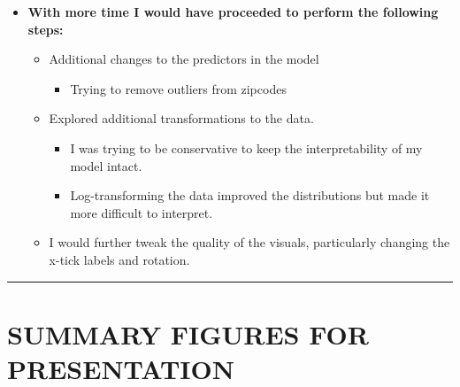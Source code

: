 \documentclass[11pt]{article}
\providecommand{\tightlist}{%
      \setlength{\itemsep}{0pt}\setlength{\parskip}{0pt}}
\begin{document}
\begin{itemize}
\tightlist
\item
  \textbf{With more time I would have proceeded to perform the following
  steps:}

  \begin{itemize}
  \tightlist
  \item
    Additional changes to the predictors in the model

    \begin{itemize}
    \tightlist
    \item
      Trying to remove outliers from zipcodes
    \end{itemize}
  \item
    Explored additional transformations to the data.

    \begin{itemize}
    \tightlist
    \item
      I was trying to be conservative to keep the interpretability of my
      model intact.
    \item
      Log-transforming the data improved the distributions but made it
      more difficult to interpret.
    \end{itemize}
  \item
    I would further tweak the quality of the visuals, particularly
    changing the x-tick labels and rotation.
  \end{itemize}
\end{itemize}

    \begin{center}\rule{0.5\linewidth}{\linethickness}\end{center}

\hypertarget{summary-figures-for-presentation}{%
\section{SUMMARY FIGURES FOR
PRESENTATION}\label{summary-figures-for-presentation}}
\end{document}
